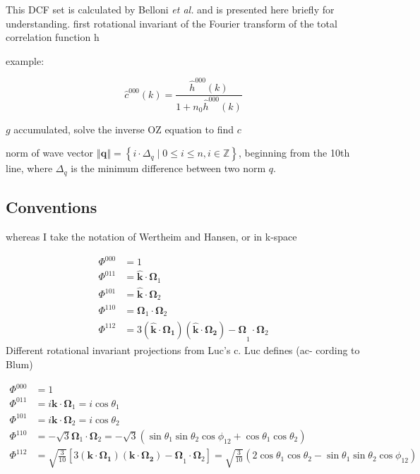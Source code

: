 This DCF set is calculated by Belloni \textit{et al.} \citep{Luc_2012}
and is presented here briefly for understanding. first rotational
invariant of the Fourier transform of the total correlation function
h

example:

\[
\hat{c}^{000}(k)=\frac{\hat{h}^{000}(k)}{1+n_{0}\hat{h}^{000}(k)}
\]


$g$ accumulated, solve the inverse OZ equation to find $c$

norm of wave vector $\left\Vert \mathbf{q}\right\Vert =\left\{ i\cdot\Delta_{q}\mid0\leq i\leq n,i\in\mathbb{Z}\right\} $,
beginning from the 10th line, where $\Delta_{q}$ is the minimum difference
between two norm $q$. 


\subsection{Conventions}

whereas I take the notation of Wertheim and Hansen, or in k-space

\begin{align}
\Phi^{000} & =1\nonumber \\
\Phi^{011} & =\hat{\mathbf{k}}\cdot\mathbf{\Omega}_{1}\nonumber \\
\Phi^{101} & =\hat{\mathbf{k}}\cdot\mathbf{\Omega}_{2}\nonumber \\
\Phi^{110} & =\mathbf{\Omega}_{1}\cdot\mathbf{\Omega}_{2}\\
\Phi^{112} & =3\mathbf{(\hat{\mathbf{k}}\cdot\mathbf{\Omega}_{1})(\hat{\mathbf{k}}\cdot\mathbf{\Omega}_{2})-\Omega}_{1}\cdot\mathbf{\Omega}_{2}\nonumber 
\end{align}
Different rotational invariant projections from Luc’s c. Luc defines
(ac- cording to Blum)

\begin{align}
\Phi^{000} & =1\nonumber \\
\Phi^{011} & =i\mathbf{k}\cdot\mathbf{\Omega}_{1}=i\cos\theta_{1}\nonumber \\
\Phi^{101} & =i\mathbf{k}\cdot\mathbf{\Omega}_{2}=i\cos\theta_{2}\nonumber \\
\Phi^{110} & =-\sqrt{3}\mathbf{\Omega}_{1}\cdot\mathbf{\Omega}_{2}=-\sqrt{3}(\sin\theta_{1}\sin\theta_{2}\cos\phi_{12}+\cos\theta_{1}\cos\theta_{2})\\
\Phi^{112} & =\sqrt{\frac{3}{10}}\left[3\mathbf{(\mathbf{k}\cdot\mathbf{\Omega}_{1})(\mathbf{k}\cdot\mathbf{\Omega}_{2})-\Omega}_{1}\cdot\mathbf{\Omega}_{2}\right]=\sqrt{\frac{3}{10}}\left(2\cos\theta_{1}\cos\theta_{2}-\sin\theta_{1}\sin\theta_{2}\cos\phi_{12}\right)\nonumber 
\end{align}



